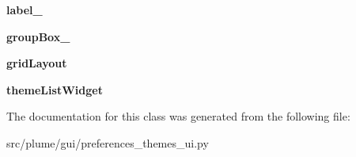 \begin{DoxyCompactItemize}
\item 
{\bfseries label\+\_}\hypertarget{classplume-creator_1_1src_1_1plume_1_1gui_1_1preferences__themes__ui_1_1_ui___themes_page_ac15a199f6015cf660228eca3c4f90610}{}\label{classplume-creator_1_1src_1_1plume_1_1gui_1_1preferences__themes__ui_1_1_ui___themes_page_ac15a199f6015cf660228eca3c4f90610}

\item 
{\bfseries group\+Box\+\_}\hypertarget{classplume-creator_1_1src_1_1plume_1_1gui_1_1preferences__themes__ui_1_1_ui___themes_page_abeb1b76aa6624fe942dd8e33b8f8b3e1}{}\label{classplume-creator_1_1src_1_1plume_1_1gui_1_1preferences__themes__ui_1_1_ui___themes_page_abeb1b76aa6624fe942dd8e33b8f8b3e1}

\item 
{\bfseries grid\+Layout}\hypertarget{classplume-creator_1_1src_1_1plume_1_1gui_1_1preferences__themes__ui_1_1_ui___themes_page_acf019238d9c90510f5cdfef16bb782fb}{}\label{classplume-creator_1_1src_1_1plume_1_1gui_1_1preferences__themes__ui_1_1_ui___themes_page_acf019238d9c90510f5cdfef16bb782fb}

\item 
{\bfseries theme\+List\+Widget}\hypertarget{classplume-creator_1_1src_1_1plume_1_1gui_1_1preferences__themes__ui_1_1_ui___themes_page_a0c60439de2988138c61ad6e9e170045e}{}\label{classplume-creator_1_1src_1_1plume_1_1gui_1_1preferences__themes__ui_1_1_ui___themes_page_a0c60439de2988138c61ad6e9e170045e}

\end{DoxyCompactItemize}


The documentation for this class was generated from the following file\+:\begin{DoxyCompactItemize}
\item 
src/plume/gui/preferences\+\_\+themes\+\_\+ui.\+py\end{DoxyCompactItemize}
